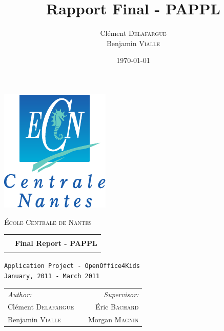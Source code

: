 \documentclass[a4paper,11pt]{article}
\title{Rapport Final - PAPPL} \author{Clément \textsc{Delafargue}\\Benjamin \textsc{Vialle}} \date{\today}
\begin{document}
	\begin{titlepage}

		\thispagestyle{empty}

		\begin{flushleft}
			\includegraphics[scale=0.8]{images/ECN.pdf}
		\end{flushleft}

		\vfill
		
		\begin{center}
			{\Large \textsc{École Centrale de Nantes}} \\

		\vspace{1cm}

		\begin{tabular}{p{0cm} c}
			\hline
			& \\
			& {\huge {\bfseries Final Report - PAPPL}} \\
			& \\
			\hline
		\end{tabular}

		\vspace{2.5cm}

		\texttt{{\large Application Project - OpenOffice4Kids}} \\
		\texttt{{\large January, 2011 - March 2011}} \\

		\vspace{2.5cm}

		\begin{tabular}{l c r}
			\large{\emph{Author:}} & \hspace{5cm} & \large{\emph{Supervisor:}} \\
			\large{Clément \textsc{Delafargue}} & \hspace{5cm} & \large{Éric \textsc{Bachard}}\\
			\large{Benjamin \textsc{Vialle}} & \hspace{5cm} & \large{Morgan \textsc{Magnin}}\\
		\end{tabular}


\end{center}
\end{titlepage}
\end{document}

